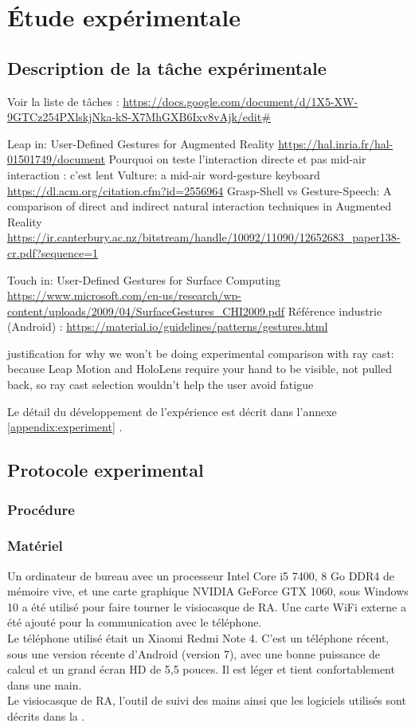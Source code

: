 \chapter{Étude expérimentale}
\label{ch:experiment}

\section{Description de la tâche expérimentale}
\label{sec:experiment_description}

Voir la liste de tâches : \url{https://docs.google.com/document/d/1X5-XW-9GTCz254PXlskjNka-kS-X7MhGXB6Ixv8vAjk/edit#}

Leap in:
User-Defined Gestures for Augmented Reality \url{https://hal.inria.fr/hal-01501749/document}
Pourquoi on teste l'interaction directe et pas mid-air interaction : c'est lent Vulture: a mid-air word-gesture keyboard \url{https://dl.acm.org/citation.cfm?id=2556964}
Grasp-Shell vs Gesture-Speech: A comparison of direct and indirect natural interaction
techniques in Augmented Reality \url{https://ir.canterbury.ac.nz/bitstream/handle/10092/11090/12652683_paper138-cr.pdf?sequence=1}

Touch in:
User-Defined Gestures for Surface Computing \url{https://www.microsoft.com/en-us/research/wp-content/uploads/2009/04/SurfaceGestures_CHI2009.pdf}
Référence industrie (Android) : \url{https://material.io/guidelines/patterns/gestures.html}

justification for why we won’t be doing experimental comparison with ray cast: because Leap Motion and HoloLens require your hand to be visible, not pulled back, so ray cast selection wouldn’t help the user avoid fatigue

Le détail du développement de l'expérience est décrit dans l'annexe \ref{appendix:experiment} .


\section{Protocole experimental}
\subsection{Procédure}

\subsection{Matériel}
Un ordinateur de bureau avec un processeur Intel Core i5 7400, 8 Go DDR4 de mémoire vive, et une carte graphique NVIDIA GeForce GTX 1060, sous Windows 10 a été utilisé pour faire tourner le visiocasque de RA. Une carte WiFi externe a été ajouté pour la communication avec le téléphone.\\
Le téléphone utilisé était un Xiaomi Redmi Note 4. C'est un téléphone récent, sous une version récente d'Android (version 7), avec une bonne puissance de calcul et un grand écran HD de 5,5 pouces. Il est léger et tient confortablement dans une main.\\
Le visiocasque de RA, l'outil de suivi des mains ainsi que les logiciels utilisés sont décrits dans la .

